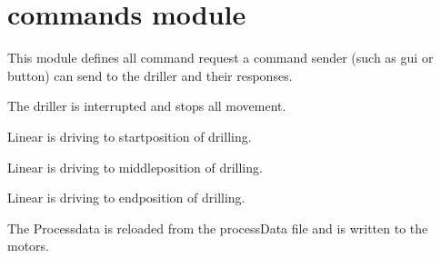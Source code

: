 \documentclass[letterpaper,10pt,english]{sphinxmanual}
\begin{document}
\section{commands module}
\label{commands:commands-module}\label{commands::doc}\label{commands:module-commands}
This module defines all command request a command sender (such as gui or button) can send to
the driller and their responses.

\begin{fulllineitems}
\label{commands:commands.INTERRUPT}
The driller is interrupted and stops all movement.

\end{fulllineitems}


\begin{fulllineitems}
\label{commands:commands.REQUEST_DRIVEX1}
Linear is driving to startposition of drilling.

\end{fulllineitems}


\begin{fulllineitems}
\label{commands:commands.REQUEST_DRIVEX2}
Linear is driving to middleposition of drilling.

\end{fulllineitems}


\begin{fulllineitems}
\label{commands:commands.REQUEST_DRIVEX3}
Linear is driving to endposition of drilling.

\end{fulllineitems}


\begin{fulllineitems}
\label{commands:commands.REQUEST_RELOADDATA}
The Processdata is reloaded from the processData file and is written to the motors.

\end{fulllineitems}
\end{document}
